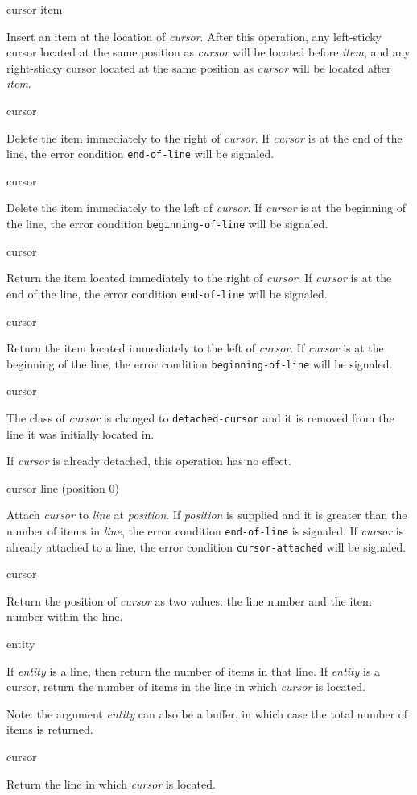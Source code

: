  {cursor item}

Insert an item at the location of \textit{cursor}.  After this
operation, any left-sticky cursor located at the same position as
\textit{cursor} will be located before \textit{item}, and any
right-sticky cursor located at the same position as \textit{cursor}
will be located after \textit{item}.

 {cursor}

Delete the item immediately to the right of \emph{cursor}.  If
\emph{cursor} is at the end of the line, the error condition
\texttt{end-of-line} will be signaled.

 {cursor}

Delete the item immediately to the left of \emph{cursor}.  If
\emph{cursor} is at the beginning of the line, the error condition
\texttt{beginning-of-line} will be signaled.

 {cursor}

Return the item located immediately to the right of \textit{cursor}.
If \emph{cursor} is at the end of the line, the error condition
\texttt{end-of-line} will be signaled.

 {cursor}

Return the item located immediately to the left of \textit{cursor}.
If \emph{cursor} is at the beginning of the line, the error condition
\texttt{beginning-of-line} will be signaled.

 {cursor}

The class of \textit{cursor} is changed to \texttt{detached-cursor}
and it is removed from the line it was initially located in. 

If \textit{cursor} is already detached, this operation has no effect.

 {cursor line \optional (position 0)}

Attach \textit{cursor} to \textit{line} at \textit{position}.  If
\textit{position} is supplied and it is greater than the number of
items in \textit{line}, the error condition \texttt{end-of-line} is
signaled.  If \textit{cursor} is already attached to a line, the error
condition \texttt{cursor-attached} will be signaled.

 {cursor}

Return the position of \textit{cursor} as two values: the line number
and the item number within the line. 

 {entity}

If \textit{entity} is a line, then return the number of items in that
line.  If \textit{entity} is a cursor, return the number of items in
the line in which \textit{cursor} is located.

Note: the argument \textit{entity} can also be a buffer, in which case
the total number of items is returned.

 {cursor}

Return the line in which \textit{cursor} is located. 
